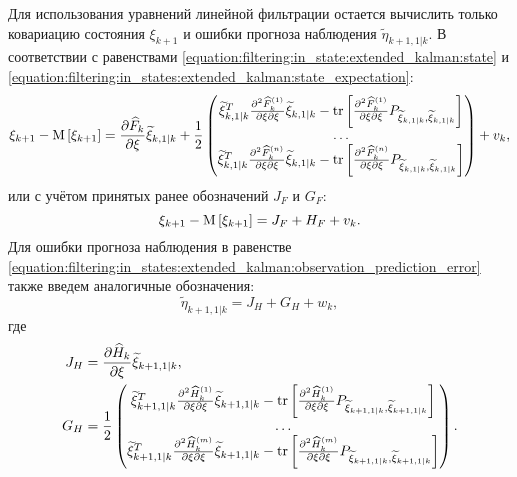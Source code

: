 Для использования уравнений линейной фильтрации остается вычислить только ковариацию состояния $\xi_{k+1}$ и ошибки прогноза наблюдения $\widetilde{\eta}_{k+1,1|k}$.
В соответствии с равенствами \eqref{equation:filtering:in_state:extended_kalman:state} и
\eqref{equation:filtering:in_states:extended_kalman:state_expectation}:
$$
    \xi_{k+1} - \mathrm{M} \left [ \xi_{k+1} \right ]
        = \frac{\partial \widehat{F}_k}{\partial \xi} \widetilde{\xi}_{k,1|k}
        + \frac{1}{2}
            \begin{pmatrix}
                \widetilde{\xi}_{k,1|k}^T \frac{\partial^2 \widehat{F}_k^{(1)}}{{\partial \xi}{\partial \xi}} \widetilde{\xi}_{k,1|k} - \mathrm{tr} \left [ \frac{\partial^2 \widehat{F}_k^{(1)}}{{\partial \xi}{\partial \xi}} P_{\widetilde{\xi}_{k,1|k}, \widetilde{\xi}_{k,1|k}} \right ] \\
                \dots \\
                \widetilde{\xi}_{k,1|k}^T \frac{\partial^2 \widehat{F}_k^{(n)}}{{\partial \xi}{\partial \xi}} \widetilde{\xi}_{k,1|k} - \mathrm{tr} \left [ \frac{\partial^2 \widehat{F}_k^{(n)}}{{\partial \xi}{\partial \xi}} P_{\widetilde{\xi}_{k,1|k}, \widetilde{\xi}_{k,1|k}} \right ]
            \end{pmatrix}
        + v_k
    ,
$$
или с учётом принятых ранее обозначений $J_F$ и $G_F$:
$$
    \xi_{k+1} - \mathrm{M} \left [ \xi_{k+1} \right ]
        = J_F + H_F + v_k.
$$
Для ошибки прогноза наблюдения в равенстве \eqref{equation:filtering:in_states:extended_kalman:observation_prediction_error} также введем
аналогичные обозначения:
$$
    \widetilde{\eta}_{k+1,1|k} = J_H + G_H + w_k ,
$$
где
\begin{align*}
    J_H & = \frac{\partial \widehat{H}_k}{\partial \xi} \widetilde{\xi}_{k+1,1|k} , \\
    G_H & = \frac{1}{2}
            \begin{pmatrix}
                \widetilde{\xi}_{k+1,1|k}^T \frac{\partial^2 \widehat{H}_k^{(1)}}{{\partial \xi}{\partial \xi}} \widetilde{\xi}_{k+1,1|k} - \mathrm{tr} \left [ \frac{\partial^2 \widehat{H}_k^{(1)}}{{\partial \xi}{\partial \xi}} P_{\widetilde{\xi}_{k+1,1|k}, \widetilde{\xi}_{k+1,1|k}} \right ] \\
                \dots \\
                \widetilde{\xi}_{k+1,1|k}^T \frac{\partial^2 \widehat{H}_k^{(m)}}{{\partial \xi}{\partial \xi}} \widetilde{\xi}_{k+1,1|k} - \mathrm{tr} \left [ \frac{\partial^2 \widehat{H}_k^{(m)}}{{\partial \xi}{\partial \xi}} P_{\widetilde{\xi}_{k+1,1|k}, \widetilde{\xi}_{k+1,1|k}} \right ]
            \end{pmatrix} . \\
\end{align*}

